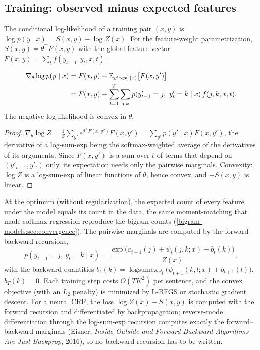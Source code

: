 \begin{notechapter}
\section{Training: observed minus expected features}\label{crf:sec:training}

The conditional log-likelihood of a training pair $(x, y)$ is $\log p(y\mid x) = S(x, y) - \log Z(x)$. For the
feature-weight parametrization, $S(x, y) = \theta^\top F(x, y)$ with the global feature vector $F(x, y) = \sum_tf(y_{t-1}, y_t, x, t)$.

\begin{proposition}\label{crf:prop:gradient}
\begin{align*}
  \nabla_\theta\log p(y\mid x) &= F(x, y) - \mathbb{E}_{y'\sim p(\cdot\mid x)}\bigl[F(x, y')\bigr]\\
  &= F(x, y) - \sum_{t=1}^T\sum_{j,k}p(y'_{t-1} = j,\ y'_t = k\mid x)\,f(j, k, x, t) .
\end{align*}
The negative log-likelihood is convex in $\theta$.
\end{proposition}

\begin{proof}
$\nabla_\theta\log Z = \frac1Z\sum_{y'}e^{\theta^\top F(x,y')}F(x, y') = \sum_{y'}p(y'\mid x)F(x, y')$, the derivative of a log-sum-exp being the
softmax-weighted average of the derivatives of its arguments. Since $F(x, y')$ is a sum over $t$ of
terms that depend on $(y'_{t-1}, y'_t)$ only, its expectation needs only the pairwise marginals. Convexity: $\log Z$
is a log-sum-exp of linear functions of $\theta$, hence convex, and $-S(x, y)$ is linear.
\end{proof}

At the optimum (without regularization), the expected count of every feature under the model
equals its count in the data, the same moment-matching that made softmax regression
reproduce the bigram counts (\cref{bigram-models:sec:convergence}). The pairwise marginals are
computed by the forward--backward recursions,
\[
  p(y_{t-1} = j,\ y_t = k\mid x) = \frac{\exp\bigl(a_{t-1}(j) + \psi_t(j, k; x) + b_t(k)\bigr)}{Z(x)},
\]
with the backward quantities $b_t(k) = \operatorname{logsumexp}_l\bigl(\psi_{t+1}(k, l; x) + b_{t+1}(l)\bigr)$, $b_T(k) = 0$. Each training step costs
$O(TK^2)$ per sentence, and the convex objective (with an $L_2$ penalty) is minimized by L-BFGS or
stochastic gradient descent. For a neural CRF, the loss $\log Z(x) - S(x, y)$ is computed with the forward
recursion and differentiated by backpropagation; reverse-mode differentiation through the
log-sum-exp recursion computes exactly the forward--backward marginals (Eisner, \emph{Inside-Outside
and Forward-Backward Algorithms Are Just Backprop}, 2016), so no backward recursion has to be
written.


\end{notechapter}
